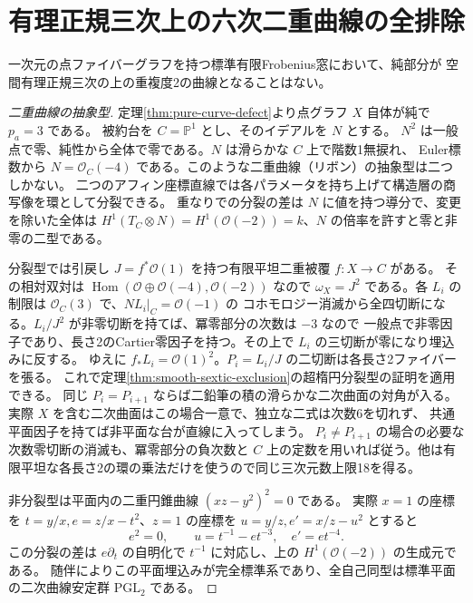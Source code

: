 \section{有理正規三次上の六次二重曲線の全排除}
\label{sec:double-twisted-cubic-exclusion}
\begin{theorem}\label{thm:double-twisted-cubic-exclusion}
一次元の点ファイバーグラフを持つ標準有限Frobenius窓において、純部分が
空間有理正規三次の上の重複度2の曲線となることはない。
\end{theorem}
\begin{proof}[二重曲線の抽象型]
定理\ref{thm:pure-curve-defect}より点グラフ $X$ 自体が純で $p_a=3$ である。
被約台を $C=\mathbb P^1$ とし、そのイデアルを $N$ とする。
$N^2$ は一般点で零、純性から全体で零である。$N$ は滑らかな $C$ 上で階数1無捩れ、
Euler標数から $N=\mathcal O_C(-4)$ である。このような二重曲線（リボン）の抽象型は二つしかない。
二つのアフィン座標直線では各パラメータを持ち上げて構造層の商写像を環として分裂できる。
重なりでの分裂の差は $N$ に値を持つ導分で、変更を除いた全体は
$H^1(T_C\otimes N)=H^1(\mathcal O(-2))=k$、$N$ の倍率を許すと零と非零の二型である。

分裂型では引戻し $J=f^*\mathcal O(1)$ を持つ有限平坦二重被覆 $f:X\to C$ がある。
その相対双対は $\operatorname{Hom}(\mathcal O\oplus\mathcal O(-4),\mathcal O(-2))$ なので
$\omega_X=J^2$ である。各 $L_i$ の制限は $\mathcal O_C(3)$ で、$N L_i|_C=\mathcal O(-1)$ の
コホモロジー消滅から全四切断になる。$L_i/J^2$ が非零切断を持てば、冪零部分の次数は $-3$ なので
一般点で非零因子であり、長さ2のCartier零因子を持つ。その上で $L_i$ の三切断が零になり埋込みに反する。
ゆえに $f_*L_i=\mathcal O(1)^2$。$P_i=L_i/J$ の二切断は各長さ2ファイバーを張る。
これで定理\ref{thm:smooth-sextic-exclusion}の超楕円分裂型の証明を適用できる。
同じ $P_i=P_{i+1}$ ならば二鉛筆の積の滑らかな二次曲面の対角が入る。
実際 $X$ を含む二次曲面はこの場合一意で、独立な二式は次数6を切れず、
共通平面因子を持てば非平面な台が直線に入ってしまう。
$P_i\ne P_{i+1}$ の場合の必要な次数零切断の消滅も、冪零部分の負次数と
$C$ 上の定数を用いれば従う。他は有限平坦な各長さ2の環の乗法だけを使うので同じ三次元数上限18を得る。

非分裂型は平面内の二重円錐曲線 $(xz-y^2)^2=0$ である。
実際 $x=1$ の座標を $t=y/x,e=z/x-t^2$、$z=1$ の座標を $u=y/z,e'=x/z-u^2$ とすると
\[
                 e^2=0,\qquad u=t^{-1}-e t^{-3},\quad e'=e t^{-4}.
\]
この分裂の差は $e\partial_t$ の自明化で $t^{-1}$ に対応し、上の $H^1(\mathcal O(-2))$ の生成元である。
随伴によりこの平面埋込みが完全標準系であり、全自己同型は標準平面の二次曲線安定群 $\mathrm{PGL}_2$ である。


\end{proof}
